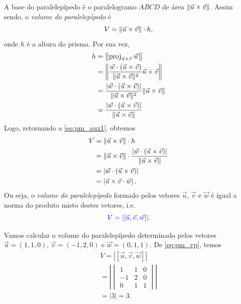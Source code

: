 A base do paralelepípedo é o paralelogramo $ABCD$ de área $\|\vec{u}\times\vec{v}\|$. Assim sendo, o \emph{volume do paralelepípedo} é
\begin{equation}\label{eq:pm_aux1}
  V = \|\vec{u}\times\vec{v}\|\cdot h,
\end{equation}
onde $h$ é a altura do prisma. Por sua vez,
\begin{align}
  h &= \left\|\operatorname{proj}_{\vec{u}\times\vec{v}}\vec{w}\right\| \\
    &= \left\|\frac{\vec{w}\cdot(\vec{u}\times\vec{v})}{\|\vec{u}\times\vec{v}\|^2}\vec{u}\times\vec{v}\right\|\\
    &= \frac{\left|\vec{w}\cdot(\vec{u}\times\vec{v})\right|}{\|\vec{u}\times\vec{v}\|^2}\|\vec{u}\times\vec{v}\|\\
    &= \frac{\left|\vec{w}\cdot(\vec{u}\times\vec{v})\right|}{\|\vec{u}\times\vec{v}\|} 
\end{align}
Logo, retornando a \eqref{eq:pm_aux1}, obtemos
\begin{align}
  V &= \|\vec{u}\times\vec{v}\|\cdot h\\
    &= \|\vec{u}\times\vec{v}\|\cdot\frac{\left|\vec{w}\cdot(\vec{u}\times\vec{v})\right|}{\|\vec{u}\times\vec{v}\|} \\
    &= \left|\vec{w}\cdot(\vec{u}\times\vec{v})\right|\\
    &= \left|\vec{u}\times\vec{v}\cdot\vec{w}\right|.
\end{align}
Ou seja, o \emph{volume do paralelepípedo} formado pelos vetores $\vec{u}$, $\vec{v}$ e $\vec{w}$ é igual a norma do produto misto destes vetores, i.e.
\begin{equation}\label{eq:pm_vp}
  {\color{blue}V = \left|[\vec{u},\vec{v},\vec{w}]\right|}.
\end{equation}

\begin{ex}
  Vamos calcular o volume do paralelepípedo determinado pelos vetores $\vec{u}=(1,1,0)$, $\vec{v}=(-1,2,0)$ e $\vec{w}=(0,1,1)$. De \eqref{eq:pm_vp}, temos
  \begin{gather}
    V = \left|[\vec{u},\vec{v},\vec{w}]\right| \\
    = \left|
      \begin{vmatrix}
        1 & 1 & 0 \\
        -1 & 2 & 0 \\
        0 & 1 & 1
      \end{vmatrix}
    \right| \\
    = |3| = 3.
  \end{gather}
\end{ex}

